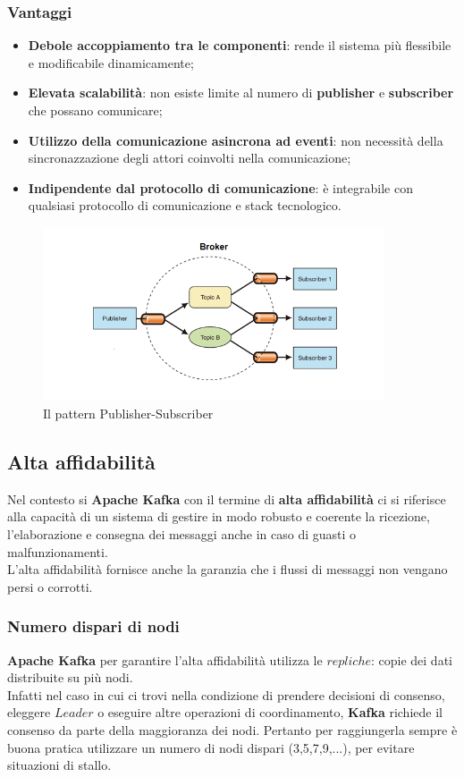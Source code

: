 \subsubsection{Vantaggi}
\begin{itemize}
    \item \textbf{Debole accoppiamento tra le componenti}:  rende il sistema più flessibile e modificabile dinamicamente;
    \item \textbf{Elevata scalabilità}: non esiste limite al numero di \textbf{publisher} e \textbf{subscriber} che possano comunicare;
    \item \textbf{Utilizzo della comunicazione asincrona ad eventi}: non necessità della sincronazzazione degli attori coinvolti nella comunicazione;
    \item \textbf{Indipendente dal protocollo di comunicazione}: è integrabile con qualsiasi protocollo di comunicazione e stack tecnologico.
\end{itemize}
\begin{figure}[h]
    \centering
    \includegraphics[width=0.9\textwidth]{images/componenti/ps-model.png}
    \caption{Il pattern Publisher-Subscriber}
    \label{fig:publisher_subscriber}
\end{figure}
\subsection{Alta affidabilità}\label{sec:alta_affidabilita}
Nel contesto si \textbf{Apache Kafka} con il termine di \textbf{alta affidabilità} ci si riferisce alla capacità di un sistema di gestire in modo
robusto e coerente la ricezione, l'elaborazione e consegna dei messaggi anche in caso di guasti o malfunzionamenti.\\
L'alta affidabilità fornisce anche la garanzia che i flussi di messaggi non vengano persi o corrotti.
\subsubsection{Numero dispari di nodi}\label{sec:numero_dispari_nodi}
\textbf{Apache Kafka} per garantire l'alta affidabilità utilizza le $repliche$: copie dei dati distribuite su più nodi.\\
Infatti nel caso in cui ci trovi nella condizione di prendere decisioni di consenso, eleggere $Leader$ o eseguire altre operazioni di coordinamento, \textbf{Kafka} richiede il consenso 
da parte della maggioranza dei nodi. Pertanto per raggiungerla sempre è buona pratica utilizzare un numero di nodi dispari (3,5,7,9,...), per evitare situazioni di stallo.\\

